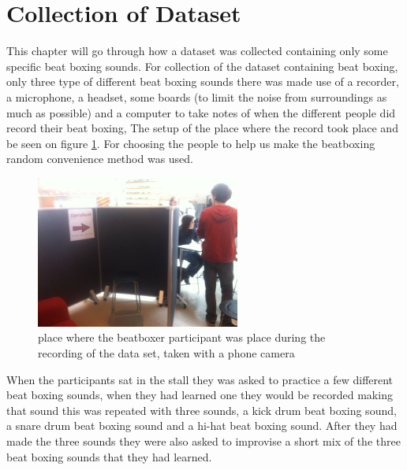 \section{Collection of Dataset}
This chapter will go through how a dataset was collected containing only some specific beat boxing sounds.
For collection of the dataset containing beat boxing, only three type of different beat boxing sounds there was made use of a recorder, a microphone, a headset, some boards (to limit the noise from surroundings as much as possible) and a computer to take notes of when the different people did record their beat boxing, The setup of the place where the record took place and be seen on figure \ref{data-collection-pic}. For choosing the people to help us make the beatboxing random convenience method was used. 
\begin{figure}[h]
	\begin{center}
		\includegraphics[height=5cm]{fig/dataset_collection.JPG}
		\caption{ place where the beatboxer participant was place during the recording of the data set, taken with a phone camera}
		\label{data-collection-pic}
	\end{center}
\end{figure}
When the participants sat in the stall they was asked to practice a few different beat boxing sounds, when they had learned one they would be recorded making that  sound this was repeated with three sounds, a kick drum beat boxing sound, a snare drum beat boxing sound and a hi-hat beat boxing sound. After they had made the three sounds they were also asked to improvise a short mix of the three beat boxing sounds that they had learned.
